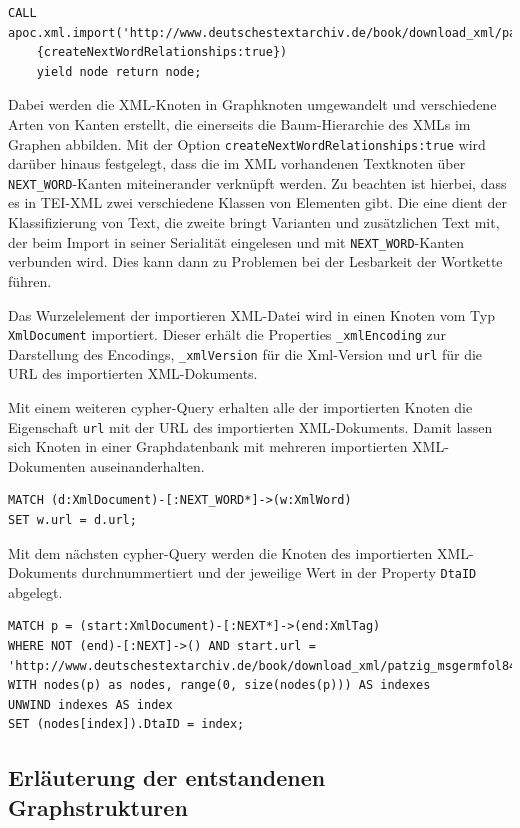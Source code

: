 \begin{verbatim}
CALL apoc.xml.import('http://www.deutschestextarchiv.de/book/download_xml/patzig_msgermfol841842_1828',
    {createNextWordRelationships:true})
    yield node return node;
\end{verbatim}

Dabei werden die XML-Knoten in Graphknoten umgewandelt und verschiedene
Arten von Kanten erstellt, die einerseits die Baum-Hierarchie des XMLs
im Graphen abbilden. Mit der Option
\texttt{createNextWordRelationships:true} wird darüber hinaus
festgelegt, dass die im XML vorhandenen Textknoten über
\texttt{NEXT\_WORD}-Kanten miteinerander verknüpft werden. Zu beachten
ist hierbei, dass es in TEI-XML zwei verschiedene Klassen von Elementen
gibt. Die eine dient der Klassifizierung von Text, die zweite bringt
Varianten und zusätzlichen Text mit, der beim Import in seiner
Serialität eingelesen und mit \texttt{NEXT\_WORD}-Kanten verbunden wird.
Dies kann dann zu Problemen bei der Lesbarkeit der Wortkette führen.

Das Wurzelelement der importieren XML-Datei wird in einen Knoten vom Typ
\texttt{XmlDocument} importiert. Dieser erhält die Properties
\texttt{\_xmlEncoding} zur Darstellung des Encodings,
\texttt{\_xmlVersion} für die Xml-Version und \texttt{url} für die URL
des importierten XML-Dokuments.

Mit einem weiteren cypher-Query erhalten alle der importierten Knoten
die Eigenschaft \texttt{url} mit der URL des importierten XML-Dokuments.
Damit lassen sich Knoten in einer Graphdatenbank mit mehreren
importierten XML-Dokumenten auseinanderhalten.

\begin{verbatim}
MATCH (d:XmlDocument)-[:NEXT_WORD*]->(w:XmlWord)
SET w.url = d.url;
\end{verbatim}

Mit dem nächsten cypher-Query werden die Knoten des importierten
XML-Dokuments durchnummertiert und der jeweilige Wert in der Property
\texttt{DtaID} abgelegt.

\begin{verbatim}
MATCH p = (start:XmlDocument)-[:NEXT*]->(end:XmlTag)
WHERE NOT (end)-[:NEXT]->() AND start.url = 'http://www.deutschestextarchiv.de/book/download_xml/patzig_msgermfol841842_1828'
WITH nodes(p) as nodes, range(0, size(nodes(p))) AS indexes
UNWIND indexes AS index
SET (nodes[index]).DtaID = index;
\end{verbatim}

\hypertarget{erluxe4uterung-der-entstandenen-graphstrukturen}{%
\subsection{Erläuterung der entstandenen
Graphstrukturen}\label{erluxe4uterung-der-entstandenen-graphstrukturen}}

